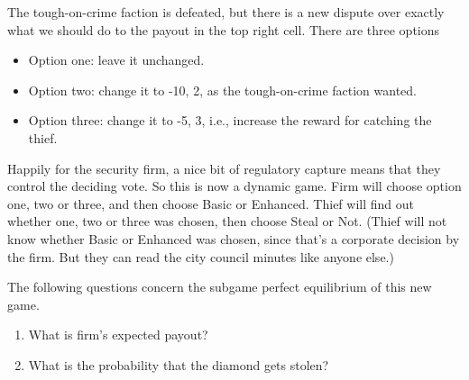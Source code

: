 \documentclass[
  11pt,
]{article}
\providecommand{\tightlist}{%
  \setlength{\itemsep}{0pt}\setlength{\parskip}{0pt}}
\begin{document}
The tough-on-crime faction is defeated, but there is a new dispute over
exactly what we should do to the payout in the top right cell. There are
three options

\begin{itemize}
\tightlist
\item
  Option one: leave it unchanged.
\item
  Option two: change it to -10, 2, as the tough-on-crime faction wanted.
\item
  Option three: change it to -5, 3, i.e., increase the reward for
  catching the thief.
\end{itemize}

Happily for the security firm, a nice bit of regulatory capture means
that they control the deciding vote. So this is now a dynamic game. Firm
will choose option one, two or three, and then choose Basic or Enhanced.
Thief will find out whether one, two or three was chosen, then choose
Steal or Not. (Thief will not know whether Basic or Enhanced was chosen,
since that's a corporate decision by the firm. But they can read the
city council minutes like anyone else.)

The following questions concern the subgame perfect equilibrium of this
new game.

\begin{enumerate}
\def\labelenumi{\arabic{enumi}.}
\setcounter{enumi}{9}
\tightlist
\item
  What is firm's expected payout?
\item
  What is the probability that the diamond gets stolen?
\end{enumerate}
\end{document}
